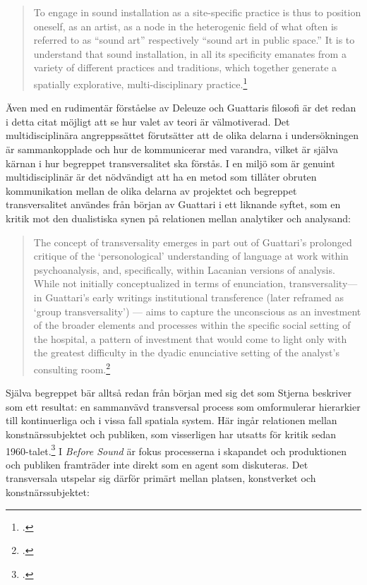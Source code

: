 \documentclass[11pt]{article}
\begin{document}
\begin{quote}
    To engage in sound installation as a site-specific practice is
    thus to position oneself, as an artist, as a node in the
    heterogenic field of what often is referred to as “sound art”
    respectively “sound art in public space.” It is to understand that
    sound installation, in all its specificity emanates from a variety
    of different practices and traditions, which together generate a
    spatially explorative, multi-disciplinary
    practice.\footcite[s.42]{Stjerna2018}
\end{quote}

Även med en rudimentär förståelse av Deleuze och Guattaris filosofi är
det redan i detta citat möjligt att se hur valet av teori är
välmotiverad. Det multidisciplinära angreppssättet förutsätter att de
olika delarna i undersökningen är sammankopplade och hur de
kommunicerar med varandra, vilket är själva kärnan i hur begreppet
transversalitet ska förstås. I en miljö som är genuint
multidisciplinär är det nödvändigt att ha en metod som tillåter
obruten kommunikation mellan de olika delarna av projektet och
begreppet transversalitet användes från början av Guattari i ett
liknande syftet, som en kritik mot den dualistiska synen på relationen
mellan analytiker och analysand:

\begin{quote}
    The concept of transversality emerges in part out of Guattari’s
    prolonged critique of the ‘personological’ understanding of
    language at work within psychoanalysis, and, specifically, within
    Lacanian versions of analysis. While not initially conceptualized
    in terms of enunciation, transversality—in Guattari’s early
    writings institutional transference (later reframed as ‘group
    transversality’) — aims to capture the unconscious as an
    investment of the broader elements and processes within the
    specific social setting of the hospital, a pattern of investment
    that would come to light only with the greatest difficulty in the
    dyadic enunciative setting of the analyst’s consulting
    room.\footcite[s.234]{Goffey2015}
\end{quote}

Själva begreppet bär alltså redan från början med sig det som Stjerna
beskriver som ett resultat: en sammanvävd transversal process som
omformulerar hierarkier till kontinuerliga och i vissa fall spatiala
system. Här ingår relationen mellan konstnärssubjektet och publiken,
som visserligen har utsatts för kritik sedan
1960-talet.\footcite[s.48]{Stjerna2018} I \emph{Before Sound} är fokus
processerna i skapandet och produktionen och publiken framträder inte
direkt som en agent som diskuteras. Det transversala utspelar sig
därför primärt mellan platsen, konstverket och konstnärssubjektet:
\end{document}

